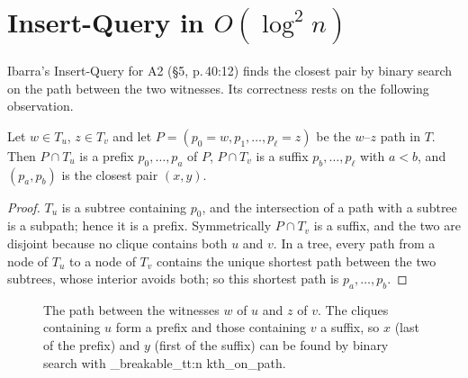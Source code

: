 \documentclass[11pt,a4paper,oneside]{report}
\theoremstyle{plain}
\theoremstyle{definition}
\theoremstyle{remark}
\newcommand{\op}[1]{\textsf{#1}}
\DeclareRobustCommand{\code}[1]{\mtp_breakable_tt:n {#1}}
\begin{document}
\section{Insert-Query in \texorpdfstring{\(O(\log^2 n)\)}{O(log\string^2 n)}}\label{sec:a2-insert-query}
Ibarra's \op{Insert-Query} for A2 (\S5, p.\,40:12) finds the closest pair by binary search on
the path between the two witnesses. Its correctness rests on the following observation.

\begin{lemma}\label{lem:prefix}
Let \(w\in T_u\), \(z\in T_v\) and let \(P=(p_0=w,p_1,\dots,p_\ell=z)\) be the \(w\)--\(z\) path
in \(T\). Then \(P\cap T_u\) is a prefix \(p_0,\dots,p_a\) of \(P\), \(P\cap T_v\) is a suffix
\(p_b,\dots,p_\ell\) with \(a<b\), and \((p_a,p_b)\) is the closest pair \((x,y)\).
\end{lemma}
\begin{proof}
\(T_u\) is a subtree containing \(p_0\), and the intersection of a path with a subtree is a
subpath; hence it is a prefix. Symmetrically \(P\cap T_v\) is a suffix, and the two are disjoint
because no clique contains both \(u\) and \(v\). In a tree, every path from a node of \(T_u\) to
a node of \(T_v\) contains the unique shortest path between the two subtrees, whose interior
avoids both; so this shortest path is \(p_a,\dots,p_b\).
\end{proof}

\begin{figure}[ht]
\centering
{}
\caption[Binary search for the closest pair in A2]{The path between the witnesses \(w\) of \(u\)
and \(z\) of \(v\). The cliques containing \(u\) form a prefix and those containing \(v\) a
suffix, so \(x\) (last of the prefix) and \(y\) (first of the suffix) can be found by binary
search with \code{kth_on_path}.}
\label{fig:binsearch}
\end{figure}
\end{document}
